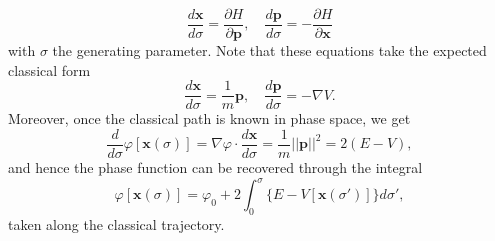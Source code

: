 \documentclass[a4paper,10pt]{paper}
\begin{document}
\begin{enumerate}
\begin{equation*}
    \frac{d\mathbf{x}}{d\sigma}=\frac{\partial H}{\partial \mathbf{p}}, \quad \frac{d\mathbf{p}}{d\sigma}=-\frac{\partial H}{\partial \mathbf{x}}
\end{equation*}
with $\sigma$ the generating parameter. Note that these equations take the expected classical form
\begin{equation*}
    \frac{d\mathbf{x}}{d\sigma}=\frac{1}{m}\mathbf{p},\quad \frac{d\mathbf{p}}{d\sigma}=-\nabla V.
\end{equation*}
Moreover, once the classical path is known in phase space, we get
\begin{equation*}
    \frac{d}{d\sigma}\varphi[\mathbf{x}(\sigma)]=\nabla\varphi\cdot\frac{d\mathbf{x}}{d\sigma}=\frac{1}{m}||\mathbf{p}||^{2}=2(E-V),
\end{equation*}
and hence the phase function can be recovered through the integral
\begin{equation*}
    \varphi[\mathbf{x}(\sigma)]=\varphi_{0}+2\int_{0}^{\sigma}\{E-V[\mathbf{x}(\sigma')]\}d\sigma',
\end{equation*}
taken along the classical trajectory.


\end{enumerate}
\end{document}
